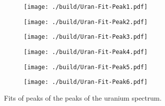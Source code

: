 \noindent
\begin{figure}[H]
	\centering
	\begin{adjustbox}{width=1.3\textwidth, center}
		\begin{subfigure}{.5\textwidth}
			\centering
			\texttt{[image: ./build/Uran-Fit-Peak1.pdf]}
		\end{subfigure}%
		\begin{subfigure}{.5\textwidth}
			\centering
			\texttt{[image: ./build/Uran-Fit-Peak2.pdf]}
		\end{subfigure}
	\end{adjustbox}
	\begin{adjustbox}{width=1.3\textwidth, center}
		\begin{subfigure}{.5\textwidth}
			\centering
			\texttt{[image: ./build/Uran-Fit-Peak3.pdf]}
		\end{subfigure}%
		\begin{subfigure}{.5\textwidth}
			\centering
			\texttt{[image: ./build/Uran-Fit-Peak4.pdf]}
		\end{subfigure}
	\end{adjustbox}
	\begin{adjustbox}{width=1.3\textwidth, center}
		\begin{subfigure}{.5\textwidth}
			\centering
			\texttt{[image: ./build/Uran-Fit-Peak5.pdf]}
		\end{subfigure}%
		\begin{subfigure}{.5\textwidth}
			\centering
			\texttt{[image: ./build/Uran-Fit-Peak6.pdf]}
		\end{subfigure}
	\end{adjustbox}
	\caption{Fits of peaks of the peaks of the uranium spectrum.}
	\label{fig:urgauss}
\end{figure}
